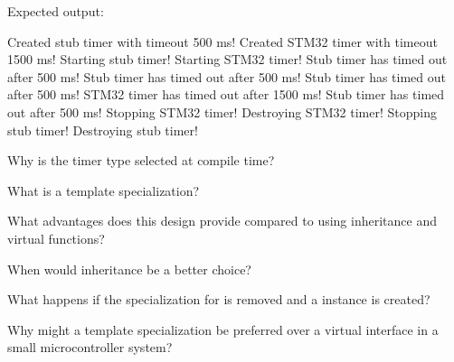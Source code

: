 \noindent Expected output:

\begin{console}
Created stub timer with timeout 500 ms!
Created STM32 timer with timeout 1500 ms!
Starting stub timer!
Starting STM32 timer!
Stub timer has timed out after 500 ms!
Stub timer has timed out after 500 ms!
Stub timer has timed out after 500 ms!
STM32 timer has timed out after 1500 ms!
Stub timer has timed out after 500 ms!
Stopping STM32 timer!
Destroying STM32 timer!
Stopping stub timer!
Destroying stub timer!
\end{console}

\label{c5:ex:3.2}
\begin{parts}
  \item Why is the timer type selected at compile time?
  \item What is a template specialization?
  \item What advantages does this design provide compared to using inheritance and virtual
    functions?
  \item When would inheritance be a better choice?
  \item What happens if the specialization for  is removed and a
     instance is created?
  \item Why might a template specialization be preferred over a virtual interface in a small
    microcontroller system?
\end{parts}
